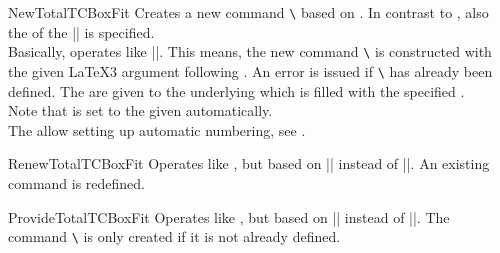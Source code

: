 \clearpage

\begin{docCommand}{NewTotalTCBoxFit}{}
  Creates a new command \texttt{\textbackslash} based on .
  In contrast to , also the  of the |\tcboxfit| is specified.\\
  Basically,  operates like |\NewDocumentCommand|. This means,
  the new command \texttt{\textbackslash} is constructed with the given
  \LaTeX3 argument  following \cite{latexproject:usrguide}.
  An error is issued if \texttt{\textbackslash} has already been defined.
  The  are given to the underlying  which is filled with
  the specified .\\
  Note that  is set to the given 
  automatically.\\
  The  allow setting up automatic numbering,
  see .

\end{docCommand}

\begin{docCommand}{RenewTotalTCBoxFit}{}
  Operates like , but based on |\RenewDocumentCommand| instead of |\NewDocumentCommand|.
  An existing command is redefined.
\end{docCommand}

\begin{docCommand}{ProvideTotalTCBoxFit}{}
  Operates like , but based on |\ProvideDocumentCommand| instead of |\NewDocumentCommand|.
  The command \texttt{\textbackslash} is only created if it is not already defined.
\end{docCommand}

